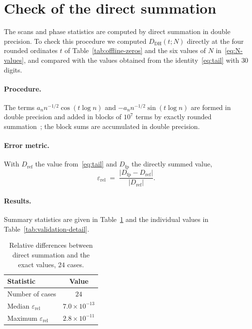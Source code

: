 \documentclass[11pt]{amsart}
\theoremstyle{definition}
\theoremstyle{remark}
\renewcommand{\DH}{\mathrm{DH}}
\newcommand{\abs}[1]{\lvert #1 \rvert}
\begin{document}
\appendix

\section{Check of the direct summation}\label{app:validation}

The scans and phase statistics are computed by direct summation in double
precision.  To check this procedure we computed $D_{\DH}(t;N)$ directly at
the four rounded ordinates $t$ of Table~\ref{tab:offline-zeros} and the
six values of $N$ in~\eqref{eq:N-values}, and compared with the values
obtained from the identity~\eqref{eq:tail} with $30$ digits.

\paragraph{Procedure.}
The terms $a_nn^{-1/2}\cos(t\log n)$ and $-a_nn^{-1/2}\sin(t\log n)$ are
formed in double precision and added in blocks of $10^7$ terms by exactly
rounded summation~\cite{Shewchuk1997}; the block sums are accumulated in
double precision.

\paragraph{Error metric.}
With $D_{\mathrm{ref}}$ the value from~\eqref{eq:tail} and
$D_{\mathrm{fp}}$ the directly summed value,
\begin{equation}\label{eq:relerr}
  \varepsilon_{\mathrm{rel}} \;=\;
  \frac{\abs{D_{\mathrm{fp}} - D_{\mathrm{ref}}}}
       {\abs{D_{\mathrm{ref}}}}.
\end{equation}

\paragraph{Results.}  Summary statistics are given in
Table~\ref{tab:validation} and the individual values in
Table~\ref{tab:validation-detail}.

\begin{table}[ht]
\centering
\caption{Relative differences between direct summation and the exact
  values, $24$ cases.}
\label{tab:validation}
\begin{tabular}{@{}lc@{}}
\toprule
Statistic & Value \\
\midrule
Number of cases     & $24$ \\
Median $\varepsilon_{\mathrm{rel}}$ & $7.0\times10^{-13}$ \\
Maximum $\varepsilon_{\mathrm{rel}}$ & $2.8\times10^{-11}$ \\
\bottomrule
\end{tabular}
\end{table}
\end{document}
